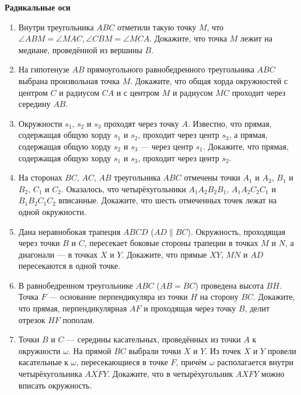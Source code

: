 \documentclass{article}
\begin{document}
\large

\begin{center}
	\textbf{Радикальные оси}
\end{center}

\begin{enumerate}[label*=\protect\fbox{\arabic{enumi}}]

\item Внутри треугольника $ABC$ отметили такую точку $M$, что $\angle ABM=\angle MAC, \angle CBM=\angle MCA$. Докажите, что точка $M$ лежит на медиане, проведённой из вершины $B$.

\setcounter{enumi}{1}
\item На гипотенузе $AB$ прямоугольного равнобедренного треугольника $ABC$ выбрана произвольная точка $M$. Докажите, что общая хорда окружностей с центром $C$ и радиусом $CA$ и с центром $M$ и радиусом $MC$ проходит через середину $AB$.

\item Окружности $s_1$, $s_2$ и $s_3$ проходят через точку $A$. Известно, что прямая, содержащая общую хорду $s_1$ и $s_2$, проходит через центр $s_3$, а прямая, содержащая общую хорду $s_2$ и $s_3$ — через центр $s_1$. Докажите, что прямая, содержащая общую хорду $s_1$ и $s_3$, проходит через центр $s_2$.

\item На сторонах $BC$, $AC$, $AB$ треугольника $ABC$ отмечены точки $A_1$ и $A_2$, $B_1$ и $B_2$, $C_1$ и $C_2$. Оказалось, что четырёхугольники $A_1A_2B_2B_1$, $A_1A_2C_2C_1$ и $B_1B_2C_1C_2$ вписанные. Докажите, что шесть отмеченных точек лежат на одной окружности.

\item Дана неравнобокая трапеция $ABCD$ ($AD\parallel BC$). Окружность, проходящая через точки $B$ и $C$, пересекает боковые стороны трапеции в точках $M$ и $N$, а диагонали — в точках $X$ и $Y$. Докажите, что прямые $XY$, $MN$ и $AD$ пересекаются в одной точке.

\item В равнобедренном треугольнике $ABC$ ($AB=BC$) проведена высота $BH$. Точка $F$ — основание перпендикуляра из точки $H$ на сторону $BC$. Докажите, что прямая, перпендикулярная $AF$ и проходящая через точку $B$, делит отрезок $HF$ пополам.

\item Точки $B$ и $C$ — середины касательных, проведённых из точки $A$ к окружности $\omega$. На прямой $BC$ выбрали точки $X$ и $Y$. Из точек $X$ и $Y$ провели касательные к $\omega$, пересекающиеся в точке $F$, причём $\omega$ располагается внутри четырёхугольника $AXFY$. Докажите, что в четырёхугольник $AXFY$ можно вписать окружность.


\end{enumerate}
\end{document}
